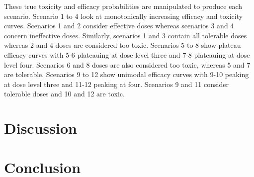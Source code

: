 These true toxicity and efficacy probabilities are manipulated to produce each scenario. Scenario 1 to 4 look at monotonically increasing efficacy and toxicity curves. Scenarios 1 and 2 consider effective doses whereas scenarios 3 and 4 concern ineffective doses. Similarly, scenarios 1 and 3 contain all tolerable doses whereas 2 and 4 doses are considered too toxic. Scenarios 5 to 8 show plateau efficacy curves with 5-6 plateauing at dose level three and 7-8 plateauing at dose level four. Scenarios 6 and 8 doses are also considered too toxic, whereas 5 and 7 are tolerable. Scenarios 9 to 12 show unimodal efficacy curves with 9-10 peaking at dose level three and 11-12 peaking at four. Scenarios 9 and 11 consider tolerable doses and 10 and 12 are toxic. 
 
  
 
 
 
 \section{Discussion}
 \label{WT:Discussion}
 
 \section{Conclusion}
 \label{WT:Conclusion}